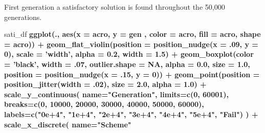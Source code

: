 \documentclass[]{book}
\newenvironment{Shaded}{\begin{snugshade}}{\end{snugshade}}
\newcommand{\DataTypeTok}[1]{\textcolor[rgb]{0.13,0.29,0.53}{#1}}
\newcommand{\DecValTok}[1]{\textcolor[rgb]{0.00,0.00,0.81}{#1}}
\newcommand{\FloatTok}[1]{\textcolor[rgb]{0.00,0.00,0.81}{#1}}
\newcommand{\KeywordTok}[1]{\textcolor[rgb]{0.13,0.29,0.53}{\textbf{#1}}}
\newcommand{\NormalTok}[1]{#1}
\newcommand{\OperatorTok}[1]{\textcolor[rgb]{0.81,0.36,0.00}{\textbf{#1}}}
\newcommand{\OtherTok}[1]{\textcolor[rgb]{0.56,0.35,0.01}{#1}}
\newcommand{\StringTok}[1]{\textcolor[rgb]{0.31,0.60,0.02}{#1}}
\begin{document}
First generation a satisfactory solution is found throughout the 50,000 generations.

\begin{Shaded}
\begin{Highlighting}[]
\NormalTok{sati_df }\OperatorTok{%>%}
\StringTok{  }\KeywordTok{ggplot}\NormalTok{(., }\KeywordTok{aes}\NormalTok{(}\DataTypeTok{x =}\NormalTok{ acro, }\DataTypeTok{y =}\NormalTok{ gen , }\DataTypeTok{color =}\NormalTok{ acro, }\DataTypeTok{fill =}\NormalTok{ acro, }\DataTypeTok{shape =}\NormalTok{ acro)) }\OperatorTok{+}
\StringTok{  }\KeywordTok{geom_flat_violin}\NormalTok{(}\DataTypeTok{position =} \KeywordTok{position_nudge}\NormalTok{(}\DataTypeTok{x =} \FloatTok{.09}\NormalTok{, }\DataTypeTok{y =} \DecValTok{0}\NormalTok{), }\DataTypeTok{scale =} \StringTok{'width'}\NormalTok{, }\DataTypeTok{alpha =} \FloatTok{0.2}\NormalTok{, }\DataTypeTok{width =} \FloatTok{1.5}\NormalTok{) }\OperatorTok{+}
\StringTok{  }\KeywordTok{geom_boxplot}\NormalTok{(}\DataTypeTok{color =} \StringTok{'black'}\NormalTok{, }\DataTypeTok{width =} \FloatTok{.07}\NormalTok{, }\DataTypeTok{outlier.shape =} \OtherTok{NA}\NormalTok{, }\DataTypeTok{alpha =} \FloatTok{0.0}\NormalTok{, }\DataTypeTok{size =} \FloatTok{1.0}\NormalTok{, }\DataTypeTok{position =} \KeywordTok{position_nudge}\NormalTok{(}\DataTypeTok{x =} \FloatTok{.15}\NormalTok{, }\DataTypeTok{y =} \DecValTok{0}\NormalTok{)) }\OperatorTok{+}
\StringTok{  }\KeywordTok{geom_point}\NormalTok{(}\DataTypeTok{position =} \KeywordTok{position_jitter}\NormalTok{(}\DataTypeTok{width =} \FloatTok{.02}\NormalTok{), }\DataTypeTok{size =} \FloatTok{2.0}\NormalTok{, }\DataTypeTok{alpha =} \FloatTok{1.0}\NormalTok{) }\OperatorTok{+}
\StringTok{  }\KeywordTok{scale_y_continuous}\NormalTok{(}
    \DataTypeTok{name=}\StringTok{"Generation"}\NormalTok{,}
    \DataTypeTok{limits=}\KeywordTok{c}\NormalTok{(}\DecValTok{0}\NormalTok{, }\DecValTok{60001}\NormalTok{),}
    \DataTypeTok{breaks=}\KeywordTok{c}\NormalTok{(}\DecValTok{0}\NormalTok{, }\DecValTok{10000}\NormalTok{, }\DecValTok{20000}\NormalTok{, }\DecValTok{30000}\NormalTok{, }\DecValTok{40000}\NormalTok{, }\DecValTok{50000}\NormalTok{, }\DecValTok{60000}\NormalTok{),}
    \DataTypeTok{labels=}\KeywordTok{c}\NormalTok{(}\StringTok{"0e+4"}\NormalTok{, }\StringTok{"1e+4"}\NormalTok{, }\StringTok{"2e+4"}\NormalTok{, }\StringTok{"3e+4"}\NormalTok{, }\StringTok{"4e+4"}\NormalTok{, }\StringTok{"5e+4"}\NormalTok{, }\StringTok{"Fail"}\NormalTok{)}
\NormalTok{  ) }\OperatorTok{+}
\StringTok{  }\KeywordTok{scale_x_discrete}\NormalTok{(}
    \DataTypeTok{name=}\StringTok{"Scheme"}
}
\end{Highlighting}
\end{Shaded}
\end{document}
